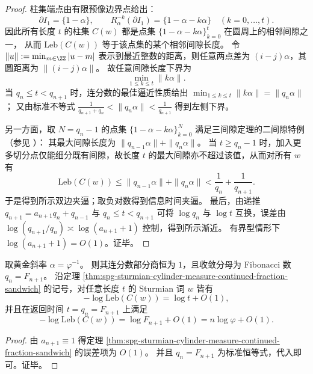 \begin{proof}
柱集端点由有限预像边界点给出：
\[
\partial I_1=\{1-\alpha\},\qquad
R_\alpha^{-k}(\partial I_1)=\{1-\alpha-k\alpha\}\quad (k=0,\dots,t).
\]
因此所有长度 \(t\) 的柱集 \(C(w)\) 都是点集 \(\{1-\alpha-k\alpha\}_{k=0}^{t}\) 在圆周上的相邻间隙之一，
从而 \(\mathrm{Leb}(C(w))\) 等于该点集的某个相邻间隙长度。
令 \(\|u\|:=\min_{m\in\ZZ}|u-m|\) 表示到最近整数的距离，则任意两点差为 \((i-j)\alpha\)，其圆距离为 \(\|(i-j)\alpha\|\)。
故任意间隙长度下界为
\[
\min_{1\le k\le t}\|k\alpha\|.
\]
当 \(q_n\le t<q_{n+1}\) 时，连分数的最佳逼近性质给出
\(
\min_{1\le k\le t}\|k\alpha\|=\|q_n\alpha\|
\)；
又由标准不等式 \(\frac{1}{q_{n+1}+q_n}<\|q_n\alpha\|<\frac{1}{q_{n+1}}\) 得到左侧下界。
\par
另一方面，取 \(N=q_n-1\) 的点集 \(\{1-\alpha-k\alpha\}_{k=0}^{N}\) 满足三间隙定理的二间隙特例（参见 \cite{Slater1950DistributionIntegers,Slater1967GapsSteps}）：
其最大间隙长度为 \(\|q_{n-1}\alpha\|+\|q_n\alpha\|\)。
当 \(t\ge q_n-1\) 时，加入更多切分点仅能细分既有间隙，故长度 \(t\) 的最大间隙亦不超过该值，从而对所有 \(w\) 有
\[
\mathrm{Leb}(C(w))\le \|q_{n-1}\alpha\|+\|q_n\alpha\|
<\frac{1}{q_n}+\frac{1}{q_{n+1}}.
\]
于是得到所示双边夹逼；取负对数得到信息时间夹逼。
最后，由递推 \(q_{n+1}=a_{n+1}q_n+q_{n-1}\) 与 \(q_n\le t<q_{n+1}\) 可将 \(\log q_n\) 与 \(\log t\) 互换，误差由 \(\log(q_{n+1}/q_n)\asymp \log(a_{n+1}+1)\) 控制，得到所示渐近。
有界型情形下 \(\log(a_{n+1}+1)=O(1)\)。证毕。
\end{proof}

\begin{corollary}\label{cor:spg-golden-sturmian-log-information-time-rigid}
取黄金斜率 \(\alpha=\varphi^{-1}\)。
则其连分数部分商恒为 \(1\)，且收敛分母为 Fibonacci 数 \(q_n=F_{n+1}\)。
沿定理 \ref{thm:spg-sturmian-cylinder-measure-continued-fraction-sandwich} 的记号，对任意长度 \(t\) 的 Sturmian 词 \(w\) 皆有
\[
-\log \mathrm{Leb}(C(w))=\log t+O(1),
\]
并且在返回时间 \(t=q_n=F_{n+1}\) 上满足
\[
-\log \mathrm{Leb}(C(w))=\log F_{n+1}+O(1)=n\log\varphi+O(1).
\]
\end{corollary}
\begin{proof}
由 \(a_{n+1}\equiv 1\) 得定理 \ref{thm:spg-sturmian-cylinder-measure-continued-fraction-sandwich} 的误差项为 \(O(1)\)。
并且 \(q_n=F_{n+1}\) 为标准恒等式，代入即可。证毕。
\end{proof}

